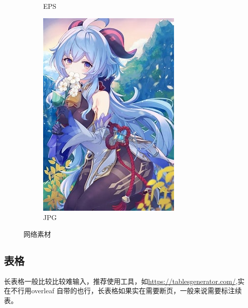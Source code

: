 \begin{figure}[!ht]
\begin{subfigure}[b]{0.32\textwidth}
        \caption{EPS}
    \end{subfigure}
    \begin{subfigure}[b]{0.32\textwidth}
        \includegraphics[width=\textwidth]{figures/float_exp_mihoyo}
        \caption{JPG}
    \end{subfigure}
    \caption{网络素材}
    \label{fig:pic}
\end{figure}

\subsection{表格}

长表格一般比较比较难输入，推荐使用工具，如\url{https://tablesgenerator.com/},实在不行用overleaf 自带的也行，长表格如果实在需要断页，一般来说需要标注续表。


